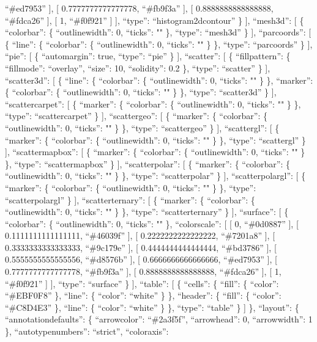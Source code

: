 \documentclass[
]{article}
\begin{document}
``\#ed7953'' {]}, {[} 0.7777777777777778, ``\#fb9f3a'' {]}, {[}
0.8888888888888888, ``\#fdca26'' {]}, {[} 1, ``\#f0f921'' {]} {]},
``type'': ``histogram2dcontour'' \} {]}, ``mesh3d'': {[} \{
``colorbar'': \{ ``outlinewidth'': 0, ``ticks'': "" \}, ``type'':
``mesh3d'' \} {]}, ``parcoords'': {[} \{ ``line'': \{ ``colorbar'': \{
``outlinewidth'': 0, ``ticks'': "" \} \}, ``type'': ``parcoords'' \}
{]}, ``pie'': {[} \{ ``automargin'': true, ``type'': ``pie'' \} {]},
``scatter'': {[} \{ ``fillpattern'': \{ ``fillmode'': ``overlay'',
``size'': 10, ``solidity'': 0.2 \}, ``type'': ``scatter'' \} {]},
``scatter3d'': {[} \{ ``line'': \{ ``colorbar'': \{ ``outlinewidth'': 0,
``ticks'': "" \} \}, ``marker'': \{ ``colorbar'': \{ ``outlinewidth'':
0, ``ticks'': "" \} \}, ``type'': ``scatter3d'' \} {]},
``scattercarpet'': {[} \{ ``marker'': \{ ``colorbar'': \{
``outlinewidth'': 0, ``ticks'': "" \} \}, ``type'': ``scattercarpet'' \}
{]}, ``scattergeo'': {[} \{ ``marker'': \{ ``colorbar'': \{
``outlinewidth'': 0, ``ticks'': "" \} \}, ``type'': ``scattergeo'' \}
{]}, ``scattergl'': {[} \{ ``marker'': \{ ``colorbar'': \{
``outlinewidth'': 0, ``ticks'': "" \} \}, ``type'': ``scattergl'' \}
{]}, ``scattermapbox'': {[} \{ ``marker'': \{ ``colorbar'': \{
``outlinewidth'': 0, ``ticks'': "" \} \}, ``type'': ``scattermapbox'' \}
{]}, ``scatterpolar'': {[} \{ ``marker'': \{ ``colorbar'': \{
``outlinewidth'': 0, ``ticks'': "" \} \}, ``type'': ``scatterpolar'' \}
{]}, ``scatterpolargl'': {[} \{ ``marker'': \{ ``colorbar'': \{
``outlinewidth'': 0, ``ticks'': "" \} \}, ``type'': ``scatterpolargl''
\} {]}, ``scatterternary'': {[} \{ ``marker'': \{ ``colorbar'': \{
``outlinewidth'': 0, ``ticks'': "" \} \}, ``type'': ``scatterternary''
\} {]}, ``surface'': {[} \{ ``colorbar'': \{ ``outlinewidth'': 0,
``ticks'': "" \}, ``colorscale'': {[} {[} 0, ``\#0d0887'' {]}, {[}
0.1111111111111111, ``\#46039f'' {]}, {[} 0.2222222222222222,
``\#7201a8'' {]}, {[} 0.3333333333333333, ``\#9c179e'' {]}, {[}
0.4444444444444444, ``\#bd3786'' {]}, {[} 0.5555555555555556,
``\#d8576b'' {]}, {[} 0.6666666666666666, ``\#ed7953'' {]}, {[}
0.7777777777777778, ``\#fb9f3a'' {]}, {[} 0.8888888888888888,
``\#fdca26'' {]}, {[} 1, ``\#f0f921'' {]} {]}, ``type'': ``surface'' \}
{]}, ``table'': {[} \{ ``cells'': \{ ``fill'': \{ ``color'':
``\#EBF0F8'' \}, ``line'': \{ ``color'': ``white'' \} \}, ``header'': \{
``fill'': \{ ``color'': ``\#C8D4E3'' \}, ``line'': \{ ``color'':
``white'' \} \}, ``type'': ``table'' \} {]} \}, ``layout'': \{
``annotationdefaults'': \{ ``arrowcolor'': ``\#2a3f5f'', ``arrowhead'':
0, ``arrowwidth'': 1 \}, ``autotypenumbers'': ``strict'', ``coloraxis'':
\end{document}
